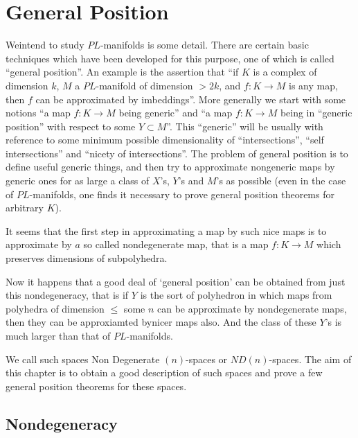 

\chapter{General Position}\label{chap5}

We\pageoriginale intend to study $PL$-manifolds is some detail. There are certain basic techniques which have been developed for this purpose, one of which is called ``general position''. An example is the assertion that ``if $K$ is a complex of dimension $k$, $M$ a $PL$-manifold of dimension $>2 k$, and $f:K\to M$ is any map, then $f$ can be approximated by imbeddings''. More generally we start with some notions ``a map $f:K\to M$ being generic'' and ``a map $f:K\to M$ being in ``generic position'' with respect to some $Y\subset M$''. This ``generic'' will be usually with reference to some minimum possible dimensionality of ``intersections'', ``self intersections'' and ``nicety of intersections''. The problem of general position is to define useful generic things, and then try to approximate nongeneric maps by generic ones for as large a class of $X$'s, $Y$'s and $M$'s as possible (even in the case of $PL$-manifolds, one finds it necessary to prove general position theorems for arbitrary $K$).

It seems that the first step in approximating a map by such nice maps is to approximate by $a$ so called nondegenerate map, that is a map $f:K\to M$ which preserves dimensions of subpolyhedra.

Now it happens that a good deal of `general position' can be obtained from just this nondegeneracy, that is if $Y$ is the sort of polyhedron in which maps from polyhedra of dimension $\leq$ some $n$ can be approximate by nondegenerate maps, then they can be approxiamted by\pageoriginale nicer maps also. And the class of these $Y$'s is much larger than that of $PL$-manifolds.

We call such spaces Non Degenerate $(n)$-spaces or $ND(n)$-spaces. The aim of this chapter is to obtain a good description of such spaces and prove a few general position theorems for these spaces.

\section{Nondegeneracy}\label{chap5-sec5.1}

